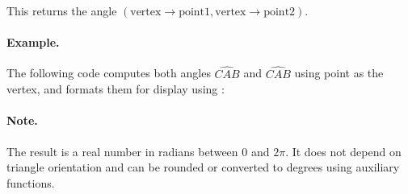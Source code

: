 \noindent
This returns the angle $(\text{vertex} \to \text{point1}, \text{vertex} \to \text{point2})$.

\paragraph{Example.}
The following code computes both angles $ \widehat{CAB}$ and $ \widehat{CAB}$ using point  as the vertex, and formats them for display using :

\begin{minipage}{0.58\textwidth}
\begin{tkzexample}
\end{tkzexample}

\begin{tkzexample}
\end{tkzexample}
\end{minipage}
\hfill
\begin{minipage}{0.40\textwidth}
\begin{center}
\end{center}
\end{minipage}

\paragraph{Note.}
The result is a real number in radians between $0$ and $2\pi$. It does not depend on triangle orientation and can be rounded or converted to degrees using auxiliary functions.


